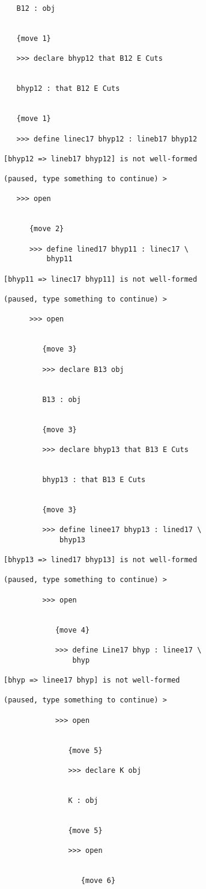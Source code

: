 \documentclass[12pt]{article}
\begin{document}
\begin{verbatim}
   B12 : obj


   {move 1}

   >>> declare bhyp12 that B12 E Cuts


   bhyp12 : that B12 E Cuts


   {move 1}

   >>> define linec17 bhyp12 : lineb17 bhyp12

[bhyp12 => lineb17 bhyp12] is not well-formed

(paused, type something to continue) >

   >>> open


      {move 2}

      >>> define lined17 bhyp11 : linec17 \
          bhyp11

[bhyp11 => linec17 bhyp11] is not well-formed

(paused, type something to continue) >

      >>> open


         {move 3}

         >>> declare B13 obj


         B13 : obj


         {move 3}

         >>> declare bhyp13 that B13 E Cuts


         bhyp13 : that B13 E Cuts


         {move 3}

         >>> define linee17 bhyp13 : lined17 \
             bhyp13

[bhyp13 => lined17 bhyp13] is not well-formed

(paused, type something to continue) >

         >>> open


            {move 4}

            >>> define Line17 bhyp : linee17 \
                bhyp

[bhyp => linee17 bhyp] is not well-formed

(paused, type something to continue) >

            >>> open


               {move 5}

               >>> declare K obj


               K : obj


               {move 5}

               >>> open


                  {move 6}


\end{verbatim}
\end{document}
